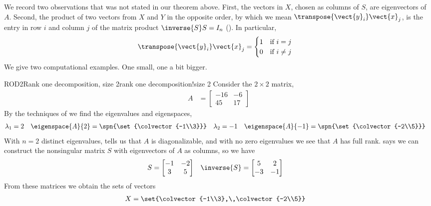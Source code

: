 %
We record two observations that was not stated in our theorem above.  First, the vectors in $X$, chosen as columns of $S$, are eigenvectors of $A$.  Second, the product of two vectors from $X$ and $Y$ in the opposite order, by which we mean $\transpose{\vect{y}_i}\vect{x}_j$, is the entry in row $i$ and column $j$ of the matrix product $\inverse{S}S=I_n$ ().  In particular, 
%
\begin{align*}
\transpose{\vect{y}_i}\vect{x}_j
&=
\begin{cases}
1&\text{if $i=j$}\\
0&\text{if $i\neq j$}
\end{cases}
\end{align*}
%
We give two computational examples.  One small, one a bit bigger.
%
\begin{example}{ROD2}{Rank one decomposition, size 2}{rank one decomposition!size 2}
Consider the $2\times 2$ matrix,
%
\begin{align*}
A&=
\begin{bmatrix}
 -16 & -6 \\
 45 & 17
\end{bmatrix}
%
\end{align*}
%
By the techniques of  we find the eigenvalues and eigenspaces,
%
\begin{align*}
\lambda_1&=2
&
\eigenspace{A}{2}&=\spn{\set{\colvector{-1\\3}}}
&
\lambda_2&=-1
&
\eigenspace{A}{-1}&=\spn{\set{\colvector{-2\\5}}}
\end{align*}
%
With $n=2$ distinct eigenvalues,  tells us that $A$ is diagonalizable, and with no zero eigenvalues we see that $A$ has full rank.   says we can construct the nonsingular matrix $S$ with eigenvectors of $A$ as columns, so we have
%
\begin{align*}
S&=
\begin{bmatrix}
-1 & -2 \\
3 & 5
\end{bmatrix}
&
\inverse{S}&=
%
\begin{bmatrix}
5 & 2 \\
-3 & -1
\end{bmatrix}
%
\end{align*}
%
From these matrices we obtain the sets of vectors
%
\begin{align*}
X&=\set{\colvector{-1\\3},\,\colvector{-2\\5}}

\end{align*}
\end{example}
